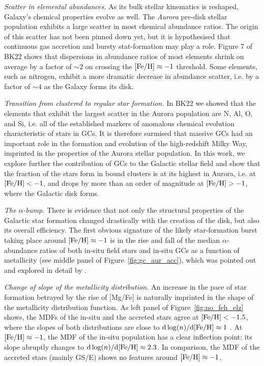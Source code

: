 \documentclass[a4paper,useAMS,usenatbib]{mnras}
\begin{document}
{\it Scatter in elemental abundances.} As its bulk  stellar kinematics is reshaped, Galaxy's chemical properties evolve as well. The {\it Aurora} pre-disk stellar population exhibits a large scatter in most chemical abundance ratios. The origin of this scatter has not been pinned down yet, but it is hypothesised that continuous gas accretion and bursty stat-formation may play a role. Figure 7 of BK22 shows that dispersions in abundance ratios of most elements shrink on average by a factor of ${\sim2}$ on crossing the $\rm [Fe/H]\approx-1$ threshold. Some elements, such as nitrogen, exhibit a more dramatic decrease in abundance scatter, i.e. by a factor of ${\sim4}$ as the Galaxy forms its disk.

{\it Transition from clustered to regular star formation.} In BK22 we showed that the elements that exhibit the largest scatter in the Aurora population are N, Al, O, and Si, i.e. all of the established markers of anomalous chemical evolution characteristic of stars in GCs. It is therefore surmised that massive GCs had an important role in the formation and evolution of the high-redshift Milky Way, imprinted in the properties of the Aurora stellar population. In this work, we explore further the contribution of GCs to the Galactic stellar field and show that the fraction of the stars form in bound clusters is at its highest in Aurora, i.e. at $\rm [Fe/H]<-1$, and drops by more than an order of magnitude at $\rm [Fe/H]>-1$, where the Galactic disk forms.

{\it The  $\alpha$-bump.} There is evidence that not only the structural properties of the Galactic star formation changed drastically with the creation of the disk, but also its overall efficiency. The first obvious signature of the likely star-formation burst taking place around $\rm [Fe/H]\approx-1$ is in the rise and fall of the median $\alpha$-abundance ratios of both in-situ field stars and in-situ GCs as a function of metallicity (see middle panel of Figure~\ref{fig:gc_aur_acc}), which was pointed out and explored in detail by \citet{Conroy2022}.

{\it Change of slope of the metallicity distribution.} An increase in the pace of star formation betrayed by the rise of [Mg/Fe] is naturally imprinted in the shape of the metallicity distribution function. As left panel of Figure~\ref{fig:no_feh_elz} shows, the MDFs of the in-situ and the accreted stars agree at $\rm [Fe/H]<-1.5$, where the slopes of both distributions are close to ${\rm d} \log(n)/{\rm d[Fe/H]}\approx1$ \citep[also see][for discussion]{Rix2022}. At $\rm [Fe/H]\approx-1$, the MDF of the in-situ population has a clear inflection point: its slope abruptly changes to ${\rm d} \log(n)/{\rm d[Fe/H]}\approx2.3$. In comparison, the MDF of the accreted stars (mainly GS/E) shows no features around $\rm [Fe/H]\approx-1$.
\end{document}
